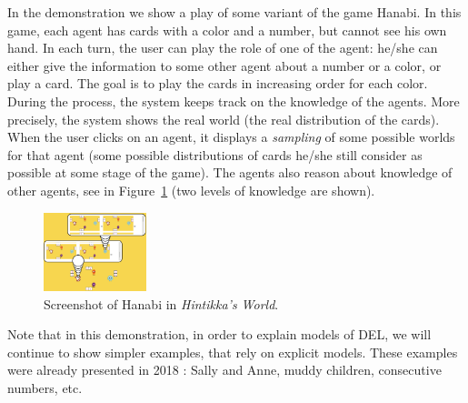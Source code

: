 
In the demonstration we show a play of some variant of the game Hanabi. 
In this game, each agent has cards with a color and a
number, but cannot see his own hand.
In each turn, the user can play the role of one of the agent: he/she can either give the information to some other agent about a number or a color, or play a card. The goal is to play the cards in increasing order for each color.
During the process, the system keeps track on the knowledge of the agents.
More precisely, the system shows the real world (the real distribution of the cards). When the user clicks on an agent, it displays a \emph{sampling} of some possible worlds for that agent (some possible distributions of cards he/she still consider as possible at some stage of the game). The agents also reason about knowledge of other agents, see in Figure~\ref{figure:guihanabi} (two levels of knowledge are shown).
%
%
%


\begin{figure}
	\begin{center}
		\includegraphics[width=3cm]{images/HW_screenshot_hanabi.png}
	\end{center}
	\caption{Screenshot of Hanabi in \emph{Hintikka's World}.\label{figure:guihanabi}}
\end{figure}

Note that in this demonstration, in order to explain models of DEL, we will continue to show simpler examples, that rely on explicit models. These examples were already presented in 2018 \cite{DBLP:conf/ijcai/Schwarzentruber18}: Sally and Anne, muddy children, consecutive numbers, etc.